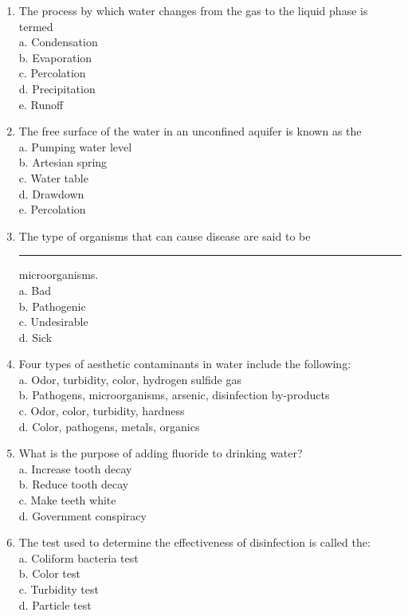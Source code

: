 \documentclass[10pt]{article}
\begin{document}
\begin{enumerate}
\item The process by which water changes from the gas to the liquid phase is termed\\
a.  Condensation\\
b.  Evaporation\\
c.  Percolation\\
d.  Precipitation\\
e.  Runoff\\

\item The free surface of the water in an unconfined aquifer is known as the\\
a.  Pumping water level\\
b.  Artesian spring\\
c.  Water table\\
d.  Drawdown\\
e.  Percolation\\


\item  The type of organisms that can cause disease are said to be \rule{2cm}{0.3pt}
microorganisms.\\
a.  Bad\\
b.  Pathogenic\\
c.  Undesirable\\
d.  Sick\\

\item  Four types of aesthetic contaminants in water include the following:\\
a.  Odor, turbidity, color, hydrogen sulfide gas\\
b.  Pathogens, microorganisms, arsenic, disinfection by-products\\
c.  Odor, color, turbidity, hardness\\
d.  Color, pathogens, metals, organics\\


\item  What is the purpose of adding fluoride to drinking water?\\
a.  Increase tooth decay\\
b.  Reduce tooth decay\\
c.  Make teeth white\\
d.  Government conspiracy\\

\item  The test used to determine the effectiveness of disinfection is called the:\\
a.  Coliform bacteria test\\
b.  Color test\\
c.  Turbidity test\\
d.  Particle test\\


\end{enumerate}
\end{document}
